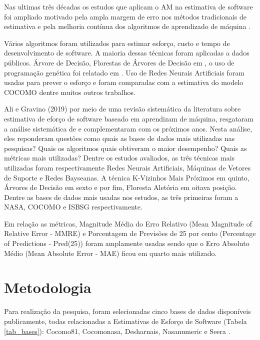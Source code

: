 \documentclass[12pt]{article}
\begin{document}
Nas ultimas três décadas os estudos que aplicam o AM na estimativa de software foi ampliado motivado pela ampla margem de erro nos métodos tradicionais de estimativa e pela melhoria contínua dos algoritmos de aprendizado de máquina \cite{banimustafa:2018}.

Vários algoritmos foram utilizados para estimar esforço, custo e tempo de desenvolvimento de software. A maioria dessas técnicas foram aplicadas a dados públicos. Árvore de Decisão, Florestas de Árvores de Decisão em \cite{nassifetal:2013}, o uso de programação genética foi relatado em \cite{chavoyaetal:2012}. Uso de Redes Neurais Artificiais foram usadas para prever o esforço e foram comparadas com a estimativa do modelo COCOMO \cite{trontoetal:2007, bhatiaattri:2015} dentre muitos outros trabalhos.

Ali e Gravino (2019) por meio de uma revisão sistemática da literatura sobre estimativa de eforço de software baseado em aprendizam de máquina, resgataram a análise sistemática de \cite{wen:2012} e complementaram com os próximos anos. Nesta análise, eles reponderam questões como quais as bases de dados mais utilizadas nas pesquisas? Quais os algoritmos quais obtiveram o maior desempenho? Quais as métricas mais utilizadas? Dentre os estudos avaliados, as três técnicas mais utilizadas foram respectivamente Redes Neurais Artificiais, Máquinas de Vetores de Suporte e Redes Bayseanas. A técnica K-Vizinhos Mais Próximos em quinto, Árvores de Decisão em sexto e por fim, Floresta Aletória em oitava posição. Dentre as bases de dados mais usadas nos estudos, as três primeiras foram a NASA, COCOMO e ISBSG respectivamente.

Em relação as métricas, Magnitude Média do Erro Relativo (Mean Magnitude of Relative Error - MMRE) e Porcentagem de Previsões de 25 por cento (Percentage of Predictions - Pred(25)) foram amplamente usadas sendo que o Erro Absoluto Médio (Mean Absolute Error - MAE) ficou em quarto mais utilizado.

\section{Metodologia}

Para realização da pesquisa, foram selecionadas cinco bases de dados disponíveis publicamente, todas  relacionadas a Estimativas de Esforço de Software (Tabela \ref{tab_bases}): Cocomo81, Cocomonasa, Desharnais, Nasanumeric e Seera \cite{promise:2005, nasanumeric:2014, seera:2020}.
\end{document}
